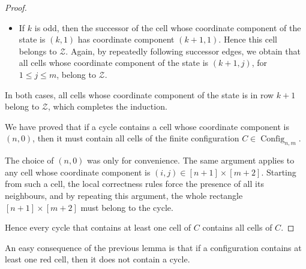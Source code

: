 \documentclass{article}
\theoremstyle{plain}
\theoremstyle{definition}
\DeclareMathOperator{\Config}{Config}
\begin{document}
\begin{proof}
\begin{itemize}
    \item If $k$ is odd, then the successor of the cell whose coordinate
    component of the state is $(k,1)$ has coordinate component
    $(k+1,1)$.
    Hence this cell belongs to $\mathcal{Z}$.
    Again, by repeatedly following successor edges, we obtain that all cells
    whose coordinate component of the state is $(k+1,j)$,
    for $1 \le j \le m$, belong to $\mathcal{Z}$.
\end{itemize}

In both cases, all cells whose coordinate component of the state
is in row $k+1$ belong to $\mathcal{Z}$, which completes the induction.

We have proved that if a cycle contains a cell whose coordinate
component is $(n,0)$, then it must contain all cells of the finite
configuration $C \in \Config_{n,m}$.

The choice of $(n,0)$ was only for convenience.
The same argument applies to any cell whose coordinate component
is $(i,j) \in [n+1]\times[m+2]$.
Starting from such a cell, the local correctness rules force the
presence of all its neighbours, and by repeating this argument,
the whole rectangle $[n+1]\times[m+2]$ must belong to the cycle.

Hence every cycle that contains at least one cell of $C$
contains all cells of $C$.
\end{proof}

An easy consequence of the previous lemma is that if a configuration contains at least one red cell, then it does not contain a cycle.
\end{document}

